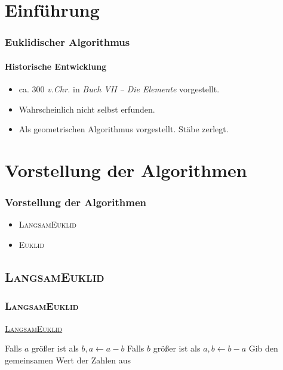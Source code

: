 \documentclass[•]{beamer}
\begin{document}
\section{Einf\"uhrung}

\begin{frame}       
	\frametitle{Euklidischer Algorithmus}
    \framesubtitle{Historische Entwicklung}
    \begin{itemize}
    \item  ca. 300 \textit{v.Chr.} in \textit{Buch VII -- Die Elemente} vorgestellt.
    \item Wahrscheinlich nicht selbst erfunden.
    \item Als geometrischen Algorithmus vorgestellt. St\"abe zerlegt.
    \end{itemize}
\end{frame}

\section{Vorstellung der Algorithmen}
\begin{frame}
	\frametitle{Vorstellung der Algorithmen}
	\begin{itemize}
	\item \textsc{LangsamEuklid}
	\item \textsc{Euklid}
	\end{itemize}
\end{frame}


\subsection{\textsc{LangsamEuklid}}
\begin{frame}
	\frametitle{\textsc{LangsamEuklid}}
	\underline{\textsc{LangsamEuklid}}
	\begin{algorithmic}[1]
	\State Falls $a$ gr\"o{\ss}er ist als $b, a\gets a-b$
	\State Falls $b$ gr\"o{\ss}er ist als $a, b\gets b-a$
\EndWhile
	\State Gib den gemeinsamen Wert der Zahlen aus
\end{algorithmic}
\end{frame}
\end{document}
